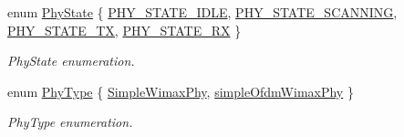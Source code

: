 \begin{DoxyCompactItemize}
enum \hyperlink{classns3_1_1WimaxPhy_a9cc75c9e84f88fc3064bba918eee1f78}{Phy\+State} \{ \hyperlink{classns3_1_1WimaxPhy_a9cc75c9e84f88fc3064bba918eee1f78a4c52321bb9dfcc8d3f50777a15b4c5ef}{P\+H\+Y\+\_\+\+S\+T\+A\+T\+E\+\_\+\+I\+D\+LE}, 
\hyperlink{classns3_1_1WimaxPhy_a9cc75c9e84f88fc3064bba918eee1f78aef116657e3f14f2ec95fa1c127ebc68d}{P\+H\+Y\+\_\+\+S\+T\+A\+T\+E\+\_\+\+S\+C\+A\+N\+N\+I\+NG}, 
\hyperlink{classns3_1_1WimaxPhy_a9cc75c9e84f88fc3064bba918eee1f78a1eb92f4a15ce9cecc184038a7204e95c}{P\+H\+Y\+\_\+\+S\+T\+A\+T\+E\+\_\+\+TX}, 
\hyperlink{classns3_1_1WimaxPhy_a9cc75c9e84f88fc3064bba918eee1f78a1a16bed30fe1b7da519c04f1160458df}{P\+H\+Y\+\_\+\+S\+T\+A\+T\+E\+\_\+\+RX}
 \}\begin{DoxyCompactList}\small\item\em Phy\+State enumeration. \end{DoxyCompactList}
\item 
enum \hyperlink{classns3_1_1WimaxPhy_a30c76d3d1853c49c26edef12338cf6b4}{Phy\+Type} \{ \hyperlink{classns3_1_1WimaxPhy_a30c76d3d1853c49c26edef12338cf6b4a460db1d63213d1adb1d974a63ee6e018}{Simple\+Wimax\+Phy}, 
\hyperlink{classns3_1_1WimaxPhy_a30c76d3d1853c49c26edef12338cf6b4a4acb2a07b3261576bb02d62eb14fa5b0}{simple\+Ofdm\+Wimax\+Phy}
 \}\begin{DoxyCompactList}\small\item\em Phy\+Type enumeration. \end{DoxyCompactList}
\end{DoxyCompactItemize}
